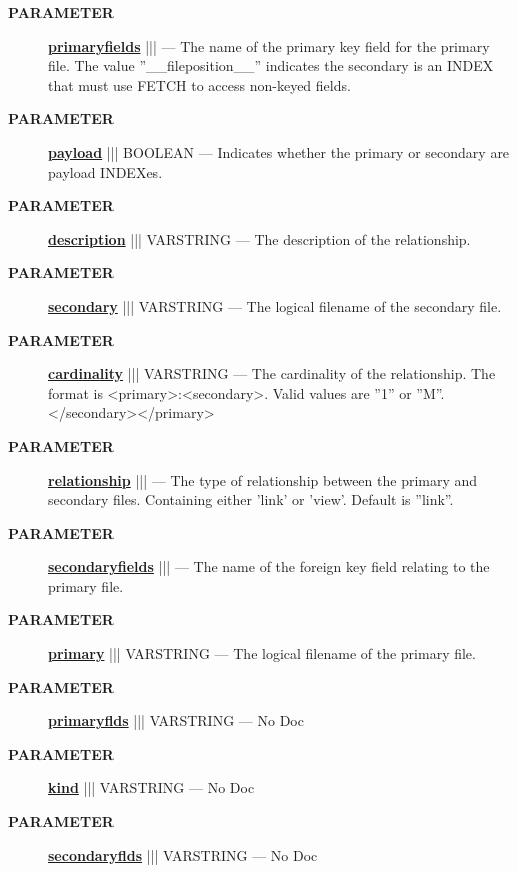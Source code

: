\par
\begin{description}
\item [\colorbox{tagtype}{\color{white} \textbf{\textsf{PARAMETER}}}] \textbf{\underline{primaryfields}} |||  --- The name of the primary key field for the primary file. The value ''\_\_fileposition\_\_'' indicates the secondary is an INDEX that must use FETCH to access non-keyed fields.
\item [\colorbox{tagtype}{\color{white} \textbf{\textsf{PARAMETER}}}] \textbf{\underline{payload}} ||| BOOLEAN --- Indicates whether the primary or secondary are payload INDEXes.
\item [\colorbox{tagtype}{\color{white} \textbf{\textsf{PARAMETER}}}] \textbf{\underline{description}} ||| VARSTRING --- The description of the relationship.
\item [\colorbox{tagtype}{\color{white} \textbf{\textsf{PARAMETER}}}] \textbf{\underline{secondary}} ||| VARSTRING --- The logical filename of the secondary file.
\item [\colorbox{tagtype}{\color{white} \textbf{\textsf{PARAMETER}}}] \textbf{\underline{cardinality}} ||| VARSTRING --- The cardinality of the relationship. The format is <primary>:<secondary>. Valid values are ''1'' or ''M''.</secondary></primary>
\item [\colorbox{tagtype}{\color{white} \textbf{\textsf{PARAMETER}}}] \textbf{\underline{relationship}} |||  --- The type of relationship between the primary and secondary files. Containing either 'link' or 'view'. Default is ''link''.
\item [\colorbox{tagtype}{\color{white} \textbf{\textsf{PARAMETER}}}] \textbf{\underline{secondaryfields}} |||  --- The name of the foreign key field relating to the primary file.
\item [\colorbox{tagtype}{\color{white} \textbf{\textsf{PARAMETER}}}] \textbf{\underline{primary}} ||| VARSTRING --- The logical filename of the primary file.
\item [\colorbox{tagtype}{\color{white} \textbf{\textsf{PARAMETER}}}] \textbf{\underline{primaryflds}} ||| VARSTRING --- No Doc
\item [\colorbox{tagtype}{\color{white} \textbf{\textsf{PARAMETER}}}] \textbf{\underline{kind}} ||| VARSTRING --- No Doc
\item [\colorbox{tagtype}{\color{white} \textbf{\textsf{PARAMETER}}}] \textbf{\underline{secondaryflds}} ||| VARSTRING --- No Doc
\end{description}







